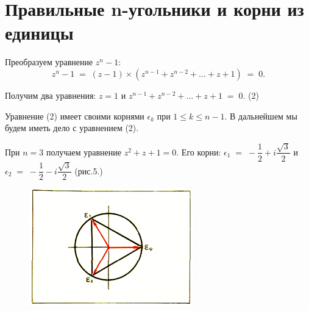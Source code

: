 \clearpage

\section{\label{sec:intro}Правильные n-угольники и корни из единицы}

Преобразуем уравнение $z^n - 1$:
$$z^n - 1 \;=\;(z - 1) \times (z^{n-1} + z^{n-2} + ... + z + 1)\;=\;0.$$

Получим два уравнения: $z = 1$ и $z^{n-1} + z^{n-2} + ... + z + 1\;=\;0.$ (2)

Уравнение (2) имеет своими корнями $\epsilon_k$ при $1 \leq k \leq n - 1.$ В дальнейшем мы будем иметь дело с уравнением (2).

При $n = 3$ получаем уравнение $z^2 + z + 1 = 0.$ Его корни: $\epsilon_1 \;=\; - \dfrac{1}{2} + i\dfrac{\sqrt{3}}{2}$ и $\epsilon_2 \;=\; - \dfrac{1}{2} - i\dfrac{\sqrt{3}}{2}$ (рис.5.)
\setcounter{page}{2}
\begin{figure}[h!]
    \centering
    \setcounter{figure}{4}
    \includegraphics[scale=0.7]{1.png}
    \label{fig:3_angle}
    \caption{     }
\end{figure}
